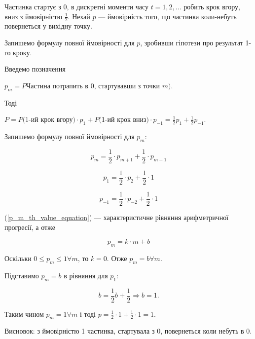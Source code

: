 \begin{example}
    Частинка стартує з 0, в дискретні моменти часу $t = 1, 2, ...$ робить 
    крок вгору, вниз з ймовірністю $\frac{1}{2}$. Нехай $p$ --- ймовірність
    того, що частинка коли-небуть повернеться у вихідну точку.
    
    Запишемо формулу повної ймовірності для $p$, зробивши
    гіпотези про результат 1-го кроку.
    
    Введемо позначення
    
    $p_m = P$Частина потрапить в 0, стартувавши з точки $m)$. 
    
    Тоді
    
    $P = P($1-ий крок вгору$) \cdot p_1 + P($1-ий крок вниз$) \cdot p_{-1}
    = \frac{1}{2} p_1 + \frac{1}{2} p_{-1}$.
    
    Запишемо формулу повної ймовірності для $p_m$:
    
    \begin{equation}
        \label{p_m_th_value_equation}
        p_m = \frac{1}{2} \cdot p_{m+1} + \frac{1}{2} \cdot p_{m-1}
    \end{equation}
    
    $$p_1 = \frac{1}{2} \cdot p_2 + \frac{1}{2} \cdot 1$$
    
    $$p_{-1} = \frac{1}{2} \cdot p_{-2} + \frac{1}{2} \cdot 1$$
    
    (\ref{p_m_th_value_equation}) --- характеристичне рівняння
    арифметричної прогресії, а отже
    
    $$p_m = k \cdot m + b$$
    
    \beautifulImage
    
    Оскільки $0 \leqslant p_m \leqslant 1 \forall m$, то
    $k = 0$. Отже $p_m = b \forall m$.
    
    Підставимо $p_m = b$ в рівняння для $p_1$:
    
    $$b = \frac{1}{2}b + \frac{1}{2} \Rightarrow b = 1.$$
    
    Таким чином $p_m = 1 \forall m$ і тоді
    $p = \frac{1}{2} \cdot 1 + \frac{1}{2} \cdot 1 = 1$.
    
    Висновок: з ймовірністю 1 частинка, стартувала з 0, повернеться коли небуть
    в 0.
\end{example}

